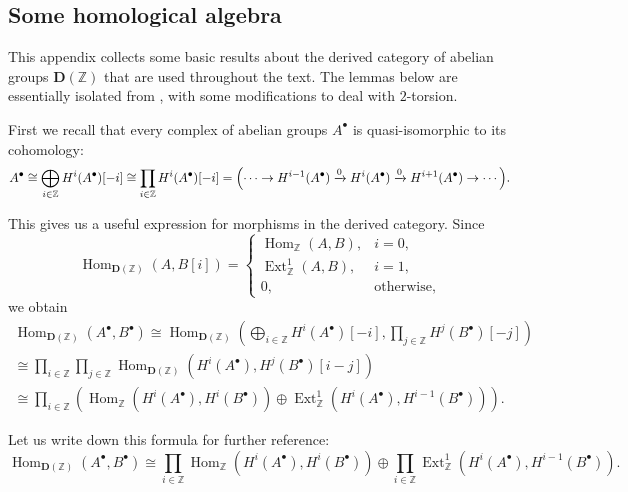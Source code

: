 \documentclass{article}
\DeclareMathOperator{\Ext}{Ext}
\DeclareMathOperator{\Hom}{Hom}
\newcommand{\ZZ}{\mathbb{Z}}
\theoremstyle{definition}
\numberwithin{equation}{section}
\begin{document}

\pagebreak
\begin{appendices}
\section{Some homological algebra}
\label{app:homological-algebra}

This appendix collects some basic results about the derived category of abelian
groups $\mathbf{D} (\ZZ)$ that are used throughout the text. The lemmas below
are essentially isolated from \cite{Flach-Morin-2018}, with some modifications
to deal with $2$-torsion.

First we recall that every complex of abelian groups $A^\bullet$ is
quasi-isomorphic to its cohomology:
\[ A^\bullet \cong \bigoplus_{i\in \ZZ} H^i (A^\bullet) [-i] \cong
\prod_{i\in \ZZ} H^i (A^\bullet) [-i] =
\Bigl(\cdots \to H^{i-1} (A^\bullet) \xrightarrow{0} H^i (A^\bullet) \xrightarrow{0} H^{i+1} (A^\bullet) \to \cdots\Bigr). \]

This gives us a useful expression for morphisms in the derived category.
Since
\[ \Hom_{\mathbf{D} (\ZZ)} (A,B [i]) = \begin{cases}
\Hom_\ZZ (A,B), & i = 0,\\
\Ext_\ZZ^1 (A,B), & i = 1,\\
0, & \text{otherwise},
\end{cases} \]
we obtain
\begin{multline*}
  \Hom_{\mathbf{D} (\ZZ)} (A^\bullet, B^\bullet) \cong
  \Hom_{\mathbf{D} (\ZZ)} (\bigoplus_{i\in\ZZ} H^i (A^\bullet) [-i], \prod_{j\in\ZZ} H^j (B^\bullet) [-j]) \\
  \cong \prod_{i\in \ZZ} \prod_{j\in \ZZ} \Hom_{\mathbf{D} (\ZZ)} (H^i (A^\bullet), H^j (B^\bullet) [i-j]) \\
  \cong \prod_{i\in \ZZ} \left(\Hom_\ZZ (H^i (A^\bullet), H^i (B^\bullet)) \oplus \Ext_\ZZ^1 (H^i (A^\bullet), H^{i-1} (B^\bullet))\right).
\end{multline*}

Let us write down this formula for further reference:
\begin{equation}
  \label{eqn:morphisms-in-D(Z)}
  \Hom_{\mathbf{D} (\ZZ)} (A^\bullet, B^\bullet) \cong
  \prod_{i\in \ZZ} \Hom_\ZZ (H^i (A^\bullet), H^i (B^\bullet)) \oplus
  \prod_{i\in \ZZ} \Ext_\ZZ^1 (H^i (A^\bullet), H^{i-1} (B^\bullet)).
\end{equation}


\end{appendices}
\end{document}
